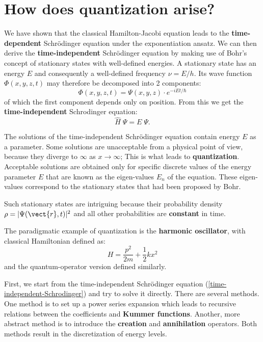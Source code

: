 \section{How does quantization arise?}

We have shown that the classical Hamilton-Jacobi equation leads to the \textbf{time-dependent} Schr\"odinger equation under the exponentiation ansatz.  We can then derive the \textbf{time-indepen\allowbreak dent} Schr\"odinger equation by making use of Bohr's concept of stationary states with well-defined energies. A stationary state has an energy $E$ and consequently a well-defined frequency $\nu = E / h$.  Its wave function $\Phi (x, y, z, t)$ may therefore be decomposed into 2 components:
\begin{equation}
\Phi (x, y, z, t) = \Psi (x, y, z) \cdot e^{-i E t / \hbar}
\end{equation}
of which the first component depends only on position.  From this we get the \textbf{time-indepen\allowbreak dent} Schrodinger equation:
\begin{equation}
\hat{H} \; \Psi = E \; \Psi .
\label{time-independent-Schrodinger}
\end{equation}

The solutions of the time-independent Schrödinger equation contain energy $E$ as a parameter. Some solutions are unacceptable from a physical point of view, because they diverge to $\infty$ as $x \rightarrow \infty$;  This is what leads to \textbf{quantization}.  Acceptable solutions are obtained only for specific discrete values of the energy parameter $E$ that are known as the eigen-values $E_n$ of the equation.  These eigen-values correspond to the stationary states that had been proposed by Bohr.

Such stationary states are intriguing because their probability density $\rho = | \Psi(\vect{r}, t) |^2 $ and all other probabilities are \textbf{constant} in time.

The paradigmatic example of quantization is the \textbf{harmonic oscillator}, with classical Hamiltonian defined as:
\begin{equation}
H = \frac{p^2}{2 m} + \frac{1}{2} k x^2
\label{harmonic-Hamiltonian}
\end{equation}
and the quantum-operator version defined similarly.

First, we start from the time-independent Schr\"odinger equation (\ref{time-independent-Schrodinger}) and try to solve it directly.  There are several methods.  One method is to set up a power series expansion which leads to recursive relations between the coefficients and \textbf{Kummer functions}.  Another, more abstract method is to introduce the \textbf{creation} and \textbf{annihilation} operators.  Both methods result in the discretization of energy levels.


